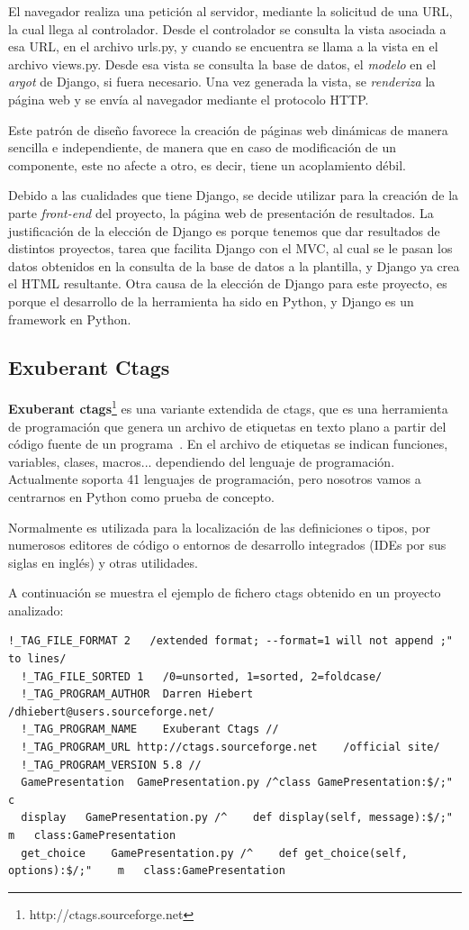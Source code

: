 \documentclass[a4paper, 12pt]{book}
\begin{document}
El navegador realiza una petición al servidor, mediante la solicitud de una URL, la cual llega al controlador. Desde el controlador se consulta la vista asociada a esa URL, en el archivo urls.py, y cuando se encuentra se  llama a la vista en el archivo views.py. Desde esa vista se consulta la base de datos, el \emph{modelo} en el \emph{argot} de Django, si fuera necesario. Una vez generada la vista, se \emph{renderiza} la página web y se envía al navegador mediante el protocolo HTTP.

Este patrón de diseño favorece la creación de páginas web dinámicas de manera sencilla e independiente, de manera que en caso de
modificación de un componente, este no afecte a otro, es decir, tiene un acoplamiento débil.

Debido a las cualidades que tiene Django, se decide utilizar para la creación de la parte \emph{front-end} del proyecto, la página web de presentación de resultados. La justificación de la elección de Django es porque tenemos que dar resultados de distintos proyectos, tarea que facilita Django con el MVC, al cual se le pasan los datos obtenidos en la consulta de la base de datos a la plantilla, y Django ya crea el HTML resultante.
Otra causa de la elección de Django para este proyecto, es porque el desarrollo de la herramienta ha sido en Python, y Django es un framework en Python.

\subsection{Exuberant Ctags}
\label{subsec:ctags}
\textbf{Exuberant ctags}\footnote{http://ctags.sourceforge.net} es una variante extendida de ctags, que es una herramienta de programación que genera un archivo de etiquetas en texto plano a partir
del código fuente de un programa~\cite{hiebert1999exuberant}. En el archivo de etiquetas se indican funciones,
variables, clases, macros... dependiendo del lenguaje de programación.
Actualmente soporta 41 lenguajes de programación, pero nosotros vamos a centrarnos en Python como prueba de concepto.

Normalmente es utilizada para la localización de las definiciones o tipos, por numerosos editores de código o entornos de desarrollo integrados (IDEs por sus siglas en inglés) y otras utilidades.

A continuación se muestra el ejemplo de fichero ctags obtenido en un proyecto analizado:

\begin{lstlisting}[basicstyle=\small, breaklines=true]
  !_TAG_FILE_FORMAT	2	/extended format; --format=1 will not append ;" to lines/
  !_TAG_FILE_SORTED	1	/0=unsorted, 1=sorted, 2=foldcase/
  !_TAG_PROGRAM_AUTHOR	Darren Hiebert	/dhiebert@users.sourceforge.net/
  !_TAG_PROGRAM_NAME	Exuberant Ctags	//
  !_TAG_PROGRAM_URL	http://ctags.sourceforge.net	/official site/
  !_TAG_PROGRAM_VERSION	5.8	//
  GamePresentation	GamePresentation.py	/^class GamePresentation:$/;"	c
  display	GamePresentation.py	/^    def display(self, message):$/;"	m	class:GamePresentation
  get_choice	GamePresentation.py	/^    def get_choice(self, options):$/;"	m	class:GamePresentation
\end{lstlisting}
\end{document}
